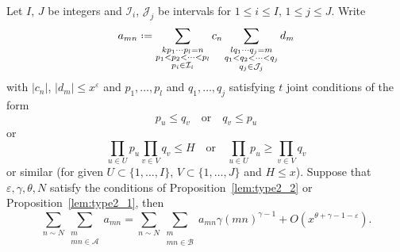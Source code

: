 \documentclass[10pt,a4paper]{amsart}
\newcommand{\cA}{\ensuremath{\mathcal{A}}}
\newcommand{\cB}{\ensuremath{\mathcal{B}}}
\newcommand{\cI}{\ensuremath{\mathcal{I}}}
\newcommand{\cJ}{\ensuremath{\mathcal{J}}}
\newcommand*{\defeq}{\mathrel{\vcenter{\baselineskip0.5ex \lineskiplimit0pt
			\hbox{\scriptsize.}\hbox{\scriptsize.}}}%
	=}
\begin{document}
\begin{lemma}\label{a_mn}
Let $I$, $J$ be integers and $\cI_i$, $\cJ_j$ be intervals for $1 \leqslant i \leqslant I$, $1 \leqslant j \leqslant J$. Write
\begin{align}\label{definition of a_mn}
a_{mn} \defeq \sum_{\substack{kp_1 \cdots p_l = n \\ p_1 < p_2 < \cdots < p_l \\ p_i \in \cI_i}} c_{n}
\sum_{\substack{lq_1 \cdots q_j = m \\ q_1 < q_2 < \cdots < q_j \\ q_j \in \cJ_j}} d_{m}
\end{align}
with $|c_n|$, $|d_m| \leqslant x^{\varepsilon}$ and $p_1, \ldots, p_l$ and $q_1, \ldots, q_j$ satisfying $t$ joint conditions of the form
$$
p_u \leqslant q_v \quad \text{or} \quad q_v \leqslant p_u
$$
or
$$
\prod_{u \in U} p_u\prod_{v \in V} q_v \leqslant H \quad \text{or} \quad \prod_{u \in U} p_u \geqslant \prod_{v \in V} q_v
$$
or similar (for given $U \subset \{1, \ldots, I \}$, $V \subset \{1, \ldots, J\}$ and $H\leqslant x$). Suppose that $\varepsilon, \gamma, \theta, N$ satisfy the conditions of Proposition~\ref{lem:type2_2} or Proposition~\ref{lem:type2_1}, then
$$
\sum_{n \sim N} \sum_{\substack{m \\ mn \in \cA}} a_{mn} = \sum_{n \sim N} \sum_{\substack{m \\ mn \in \cB}} a_{mn} \gamma(mn)^{\gamma-1} + O(x^{\theta + \gamma - 1 -\varepsilon}).
$$
\end{lemma}
\end{document}
